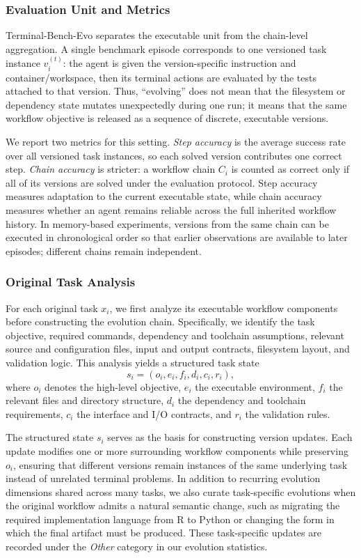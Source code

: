 \documentclass{article}
\begin{document}
\subsubsection{Evaluation Unit and Metrics}
\label{app:terminal_eval_unit_metrics}
Terminal-Bench-Evo separates the executable unit from the chain-level aggregation. A single benchmark episode corresponds to one versioned task instance $v_i^{(t)}$: the agent is given the version-specific instruction and container/workspace, then its terminal actions are evaluated by the tests attached to that version. Thus, ``evolving'' does not mean that the filesystem or dependency state mutates unexpectedly during one run; it means that the same workflow objective is released as a sequence of discrete, executable versions.

We report two metrics for this setting. \emph{Step accuracy} is the average success rate over all versioned task instances, so each solved version contributes one correct step. \emph{Chain accuracy} is stricter: a workflow chain $C_i$ is counted as correct only if all of its versions are solved under the evaluation protocol. Step accuracy measures adaptation to the current executable state, while chain accuracy measures whether an agent remains reliable across the full inherited workflow history. In memory-based experiments, versions from the same chain can be executed in chronological order so that earlier observations are available to later episodes; different chains remain independent.


\subsubsection{Original Task Analysis}
\label{app:terminal_task_analysis}
For each original task $x_i$, we first analyze its executable workflow components before constructing the evolution chain. Specifically, we identify the task objective, required commands, dependency and toolchain assumptions, relevant source and configuration files, input and output contracts, filesystem layout, and validation logic. This analysis yields a structured task state
\[
s_i = (o_i, e_i, f_i, d_i, c_i, r_i),
\]
where $o_i$ denotes the high-level objective, $e_i$ the executable environment, $f_i$ the relevant files and directory structure, $d_i$ the dependency and toolchain requirements, $c_i$ the interface and I/O contracts, and $r_i$ the validation rules.

The structured state $s_i$ serves as the basis for constructing version updates. Each update modifies one or more surrounding workflow components while preserving $o_i$, ensuring that different versions remain instances of the same underlying task instead of unrelated terminal problems. In addition to recurring evolution dimensions shared across many tasks, we also curate task-specific evolutions when the original workflow admits a natural semantic change, such as migrating the required implementation language from R to Python or changing the form in which the final artifact must be produced. These task-specific updates are recorded under the \emph{Other} category in our evolution statistics.
\end{document}

